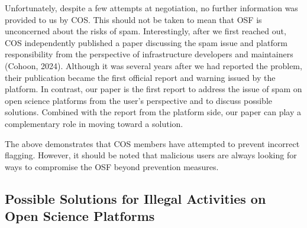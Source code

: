 \documentclass[authordate, meta, issue]{jote-new-article}
\begin{document}
	Unfortunately, despite a few attempts at negotiation, no further information was provided to us by COS. This should not be taken to mean that OSF is unconcerned about the risks of spam. Interestingly, after we first reached out, COS independently published a paper discussing the spam issue and platform responsibility from the perspective of infrastructure developers and maintainers (Cohoon, 2024). Although it was several years after we had reported the problem, their publication became the first official report and warning issued by the platform. In contrast, our paper is the first report to address the issue of spam on open science platforms from the user's perspective and to discuss possible solutions. Combined with the report from the platform side, our paper can play a complementary role in moving toward a solution.



	The above demonstrates that COS members have attempted to prevent incorrect flagging. However, it should be noted that malicious users are always looking for ways to compromise the OSF beyond prevention measures.







	\subsection{Possible Solutions for Illegal Activities on Open Science Platforms}
\end{document}
